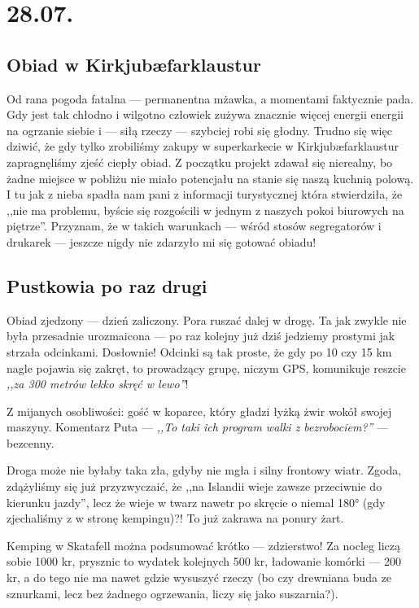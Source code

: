 \chapter*{28.07.}

\section*{Obiad w Kirkjubæfarklaustur}

Od rana pogoda fatalna --- permanentna mżawka, a momentami faktycznie pada. Gdy jest tak chłodno i wilgotno człowiek zużywa znacznie więcej energii energii na ogrzanie siebie i --- siłą rzeczy --- szybciej robi się głodny. Trudno się więc dziwić, że gdy tylko zrobiliśmy zakupy w superkarkecie w Kirkjubæfarklaustur zapragnęliśmy zjeść ciepły obiad. Z początku projekt zdawał się nierealny, bo żadne miejsce w pobliżu nie miało potencjału na stanie się naszą kuchnią polową. I tu jak z nieba spadła nam pani z informacji turystycznej która stwierdziła, że ,,nie ma problemu, byście się rozgościli w jednym z naszych pokoi biurowych na piętrze''. Przyznam, że w takich warunkach --- wśród stosów segregatorów i drukarek --- jeszcze nigdy nie zdarzyło mi się gotować obiadu!


\section*{Pustkowia po raz drugi}

Obiad zjedzony --- dzień zaliczony. Pora ruszać dalej w drogę. Ta jak zwykle nie była przesadnie urozmaicona --- po raz kolejny już dziś jedziemy prostymi jak strzała odcinkami. Dosłownie! Odcinki są tak proste, że gdy po 10 czy 15 km nagle pojawia się zakręt, to prowadzący grupę, niczym GPS, komunikuje reszcie \emph{,,za 300 metrów lekko skręć w lewo''}!

Z mijanych osobliwości: gość w koparce, który gładzi łyżką żwir wokół swojej maszyny. Komentarz Puta --- \emph{,,To taki ich program walki z bezrobociem?''} --- bezcenny.


Droga może nie byłaby taka zła, gdyby nie mgła i silny frontowy wiatr. Zgoda, zdążyliśmy się już przyzwyczaić, że ,,na Islandii wieje zawsze przeciwnie do kierunku jazdy'', lecz że wieje w twarz nawetr po skręcie o niemal 180° (gdy zjechaliśmy z  w stronę kempingu)?! To już zakrawa na ponury żart.


Kemping w Skatafell można podsumować krótko --- zdzierstwo! Za nocleg liczą sobie 1000 kr, prysznic to wydatek kolejnych 500 kr, ładowanie komórki --- 200 kr, a do tego nie ma nawet gdzie wysuszyć rzeczy (bo czy drewniana buda ze sznurkami, lecz bez żadnego ogrzewania, liczy się jako suszarnia?).
